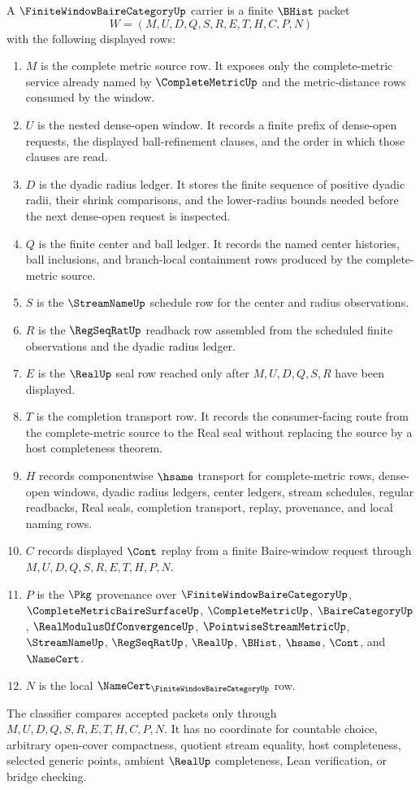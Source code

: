\begin{definition}
\label{def:finite-window-baire-category-carrier}
A $\FiniteWindowBaireCategoryUp$ carrier is a finite $\BHist$ packet
$$
W=(M,U,D,Q,S,R,E,T,H,C,P,N)
$$
with the following displayed rows:
\begin{enumerate}
\item $M$ is the complete metric source row. It exposes only the complete-metric service already named by $\CompleteMetricUp$ and the metric-distance rows consumed by the window.
\item $U$ is the nested dense-open window. It records a finite prefix of dense-open requests, the displayed ball-refinement clauses, and the order in which those clauses are read.
\item $D$ is the dyadic radius ledger. It stores the finite sequence of positive dyadic radii, their shrink comparisons, and the lower-radius bounds needed before the next dense-open request is inspected.
\item $Q$ is the finite center and ball ledger. It records the named center histories, ball inclusions, and branch-local containment rows produced by the complete-metric source.
\item $S$ is the $\StreamNameUp$ schedule row for the center and radius observations.
\item $R$ is the $\RegSeqRatUp$ readback row assembled from the scheduled finite observations and the dyadic radius ledger.
\item $E$ is the $\RealUp$ seal row reached only after $M,U,D,Q,S,R$ have been displayed.
\item $T$ is the completion transport row. It records the consumer-facing route from the complete-metric source to the Real seal without replacing the source by a host completeness theorem.
\item $H$ records componentwise $\hsame$ transport for complete-metric rows, dense-open windows, dyadic radius ledgers, center ledgers, stream schedules, regular readbacks, Real seals, completion transport, replay, provenance, and local naming rows.
\item $C$ records displayed $\Cont$ replay from a finite Baire-window request through $M,U,D,Q,S,R,E,T,H,P,N$.
\item $P$ is the $\Pkg$ provenance over $\FiniteWindowBaireCategoryUp$, $\CompleteMetricBaireSurfaceUp$, $\CompleteMetricUp$, $\BaireCategoryUp$, $\RealModulusOfConvergenceUp$, $\PointwiseStreamMetricUp$, $\StreamNameUp$, $\RegSeqRatUp$, $\RealUp$, $\BHist$, $\hsame$, $\Cont$, and $\NameCert$.
\item $N$ is the local $\NameCert_{\FiniteWindowBaireCategoryUp}$ row.
\end{enumerate}
The classifier compares accepted packets only through $M,U,D,Q,S,R,E,T,H,C,P,N$. It has no coordinate for countable choice, arbitrary open-cover compactness, quotient stream equality, host completeness, selected generic points, ambient $\RealUp$ completeness, Lean verification, or bridge checking.
\end{definition}
